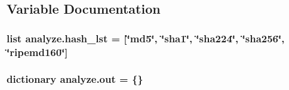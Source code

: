 \subsection{Variable Documentation}
\hypertarget{namespaceanalyze_a1762bc2a0a6b022eefa0f561255d5a2e}{
\subsubsection[{hash\-\_\-lst}]{\setlength{\rightskip}{0pt plus 5cm}list analyze.\-hash\-\_\-lst = \mbox{[}\char`\"{}md5\char`\"{}, \char`\"{}sha1\char`\"{}, \char`\"{}sha224\char`\"{}, \char`\"{}sha256\char`\"{}, \char`\"{}ripemd160\char`\"{}\mbox{]}}}\label{namespaceanalyze_a1762bc2a0a6b022eefa0f561255d5a2e}
\hypertarget{namespaceanalyze_a72c64954c54f4ec0b44182dc499cd0c9}{
\subsubsection[{out}]{\setlength{\rightskip}{0pt plus 5cm}dictionary analyze.\-out = \{\}}}\label{namespaceanalyze_a72c64954c54f4ec0b44182dc499cd0c9}
